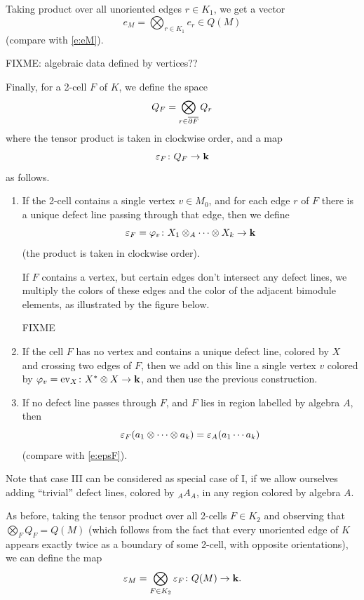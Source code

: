 \begin{defectfiguresetup}
Taking product over all unoriented edges $r\in K_1$, we get a vector
$$
e_M=\bigotimes_{r\in K_1} e_r\in Q(M)
$$
(compare with \eqref{e:eM}).


FIXME: algebraic data defined by vertices??


Finally, for a 2-cell $F$ of $K$, we define the space
$$
Q_F=\bigotimes_{r\in \overline{\partial F}}Q_r
$$
where the tensor product is taken in clockwise order, and
a map
$$
\varepsilon_F \colon Q_F\to \mathbf{k}
$$
as follows.

\begin{enumerate}
	\item[I.]
    If the 2-cell contains a single vertex $v\in M_0$, and for each edge $r$ of
    $F$ there is a unique defect line passing through that edge, then we
    define
    \begin{equation}
      \varepsilon_F=\varphi_v\colon X_1\otimes_{A}\dots \otimes X_k\to \mathbf{k}
		\end{equation}
    (the product is taken in clockwise order).

    If $F$ contains a vertex, but certain edges don't intersect any defect
    lines, we multiply the colors of these edges and the color of the adjacent
    bimodule elements, as illustrated by the figure below.

FIXME

  \item[II.]
    If the cell $F$ has no vertex and contains a unique defect line, colored by
    $X$ and crossing two edges of $F$, then we add on this line a single vertex
    $v$ colored by $\varphi_v=\operatorname{ev}_X\colon X^*\otimes X\to \mathbf{k}$, and then use the
    previous construction.

	\item[III.] If no defect line passes through $F$, and $F$ lies in region
    labelled by algebra $A$, then
    $$
    \varepsilon_F(a_1 \otimes \cdots\otimes  a_k) = \varepsilon_{A}(a_1 \cdots a_k)
    $$
    (compare with \eqref{e:epsF}).
\end{enumerate}

Note that case  III can be considered as special case of I, if we allow
ourselves adding ``trivial'' defect lines, colored by ${}_AA_A$,  in any region
colored by algebra $A$.

As before, taking the tensor product over all 2-cells  $F\in K_2$ and observing
that $\bigotimes_F Q_F=Q(M)$ (which follows from the fact that every unoriented
edge of $K$ appears exactly twice as a boundary of some 2-cell, with opposite
orientations), we can define the map
$$
\varepsilon_M=\bigotimes_{F\in K_2} \varepsilon_F \colon Q(M)\to \mathbf{k}.
$$


\end{defectfiguresetup}
